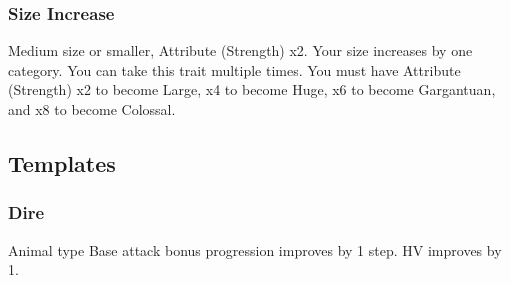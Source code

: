 \subsubsection{Size Increase}
\featpre Medium size or smaller, Attribute (Strength) x2.
\featben Your size increases by one category.
 You can take this trait multiple times. You must have Attribute (Strength) x2 to become Large, x4 to become Huge, x6 to become Gargantuan, and x8 to become Colossal.

\subsection{Templates}
\subsubsection{Dire}
\featpre Animal type
\featben Base attack bonus progression improves by 1 step. HV improves by 1.
